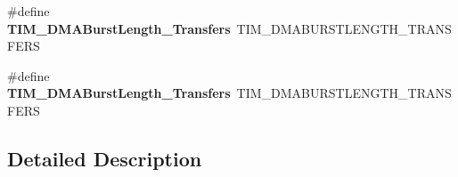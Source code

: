 \begin{DoxyCompactItemize}
\item 
\hypertarget{group___h_a_l___t_i_m___aliased___defines_ga5b2c97f650a3c1726965187d852b8cc5}{\#define {\bfseries T\-I\-M\-\_\-\-D\-M\-A\-Burst\-Length\-\_\-Transfers}~T\-I\-M\-\_\-\-D\-M\-A\-B\-U\-R\-S\-T\-L\-E\-N\-G\-T\-H\-\_\-T\-R\-A\-N\-S\-F\-E\-R\-S}\label{group___h_a_l___t_i_m___aliased___defines_ga5b2c97f650a3c1726965187d852b8cc5}

\item 
\hypertarget{group___h_a_l___t_i_m___aliased___defines_gaed9f2afef174079f6eb6927abd995b9b}{\#define {\bfseries T\-I\-M\-\_\-\-D\-M\-A\-Burst\-Length\-\_\-Transfers}~T\-I\-M\-\_\-\-D\-M\-A\-B\-U\-R\-S\-T\-L\-E\-N\-G\-T\-H\-\_\-T\-R\-A\-N\-S\-F\-E\-R\-S}\label{group___h_a_l___t_i_m___aliased___defines_gaed9f2afef174079f6eb6927abd995b9b}

\end{DoxyCompactItemize}


\subsection{Detailed Description}

